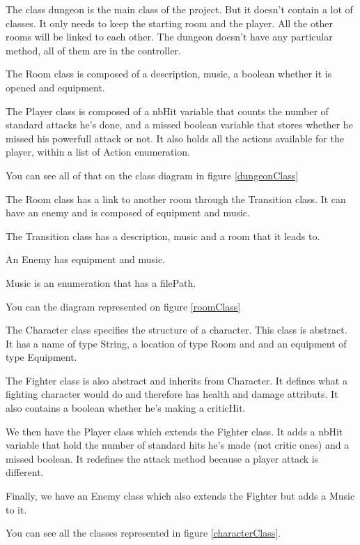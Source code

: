 \documentclass[11pt]{extarticle}
\begin{document}
The class dungeon is the main class of the project. But it doesn't contain a lot of classes. It only needs to keep the starting room and the player. All the other rooms will be linked to each other. The dungeon doesn't have any particular method, all of them are in the controller.

The Room class is composed of a description, music, a boolean whether it is opened and equipment. 

The Player class is composed of a nbHit variable that counts the number of standard attacks he's done, and a missed boolean variable that stores whether he missed his powerfull attack or not. It also holds all the actions available for the player, within a list of Action enumeration.

You can see all of that on the class diagram in figure \ref{dungeonClass}

\vspace{\baselineskip}

The Room class has a link to another room through the Transition class. It can have an enemy and is composed of equipment and music. 

The Transition class has a description, music and a room that it leads to.

An Enemy has equipment and music.

Music is an enumeration that has a filePath.

You can the diagram represented on figure \ref{roomClass}

\vspace{\baselineskip}

The Character class specifies the structure of a character. This class is abstract. It has a name of type String, a location of type Room and and an equipment of type Equipment. 

The Fighter class is also abstract and inherits from Character. It defines what a fighting character would do and therefore has health and damage attributs. It also contains a boolean whether he's making a criticHit.

We then have the Player class which extends the Fighter class. It adds a nbHit variable that hold the number of standard hits he's made (not critic ones) and a missed boolean. It redefines the attack method because a player attack is different.

Finally, we have an Enemy class which also extends the Fighter but adds a Music to it.

You can see all the classes represented in figure \ref{characterClass}.
\end{document}
